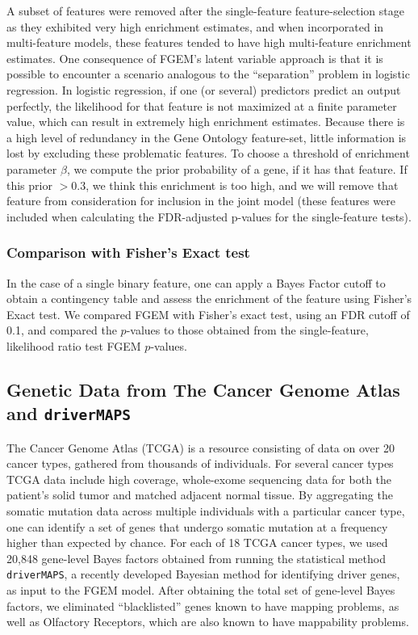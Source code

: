     A subset of features were removed after the single-feature feature-selection stage as they exhibited very high enrichment estimates, and when incorporated in multi-feature models, these features tended to have high multi-feature enrichment estimates. One consequence of FGEM's latent variable approach is that it is possible to encounter a scenario analogous to the ``separation'' problem in logistic regression.  In logistic regression, if one (or several) predictors predict an output perfectly, the likelihood for that feature is not maximized at a finite parameter value, which can result in extremely high enrichment estimates.  Because there is a high level of redundancy in the Gene Ontology feature-set, little information is lost by excluding these problematic features. To choose a threshold of enrichment parameter $\beta$, we compute the prior probability of a gene, if it has that feature. If this prior $> 0.3$, we think this enrichment is too high, and we will remove that feature from consideration for inclusion in the joint model (these features were included when calculating the FDR-adjusted p-values for the single-feature tests).  

\subsubsection{Comparison with Fisher's Exact test}\label{sec:orge6f1632}

In the case of a single binary feature, one can apply a Bayes Factor cutoff to obtain a contingency table and assess the enrichment of the feature using Fisher's Exact test.
We compared FGEM with Fisher's exact test, using an FDR cutoff of 0.1, and compared the $p$-values to those obtained from the single-feature, likelihood ratio test FGEM $p$-values.

\subsection{Genetic Data from The Cancer Genome Atlas and \texttt{driverMAPS}}\label{sec:org31ff9f1}

The Cancer Genome Atlas (TCGA) is a resource consisting of data on over 20 cancer types, gathered from thousands of individuals\cite{TCGA}.  For several cancer types TCGA data include high coverage, whole-exome sequencing data for both the patient's solid tumor and matched adjacent normal tissue. By aggregating the somatic mutation data across multiple individuals with a particular cancer type, one can identify a set of genes that undergo somatic mutation at a frequency higher than expected by chance.  For each of 18 TCGA cancer types, we used 20,848 gene-level Bayes factors obtained from running the statistical method \texttt{driverMAPS}, a recently developed Bayesian method for identifying driver genes, as input to the FGEM model.  After obtaining the total set of gene-level Bayes factors, we eliminated ``blacklisted'' genes known to have mapping problems\cite{drivermapsblacklist}, as well as Olfactory Receptors, which are also known to have mappability problems\cite{Derrien_2012}.

